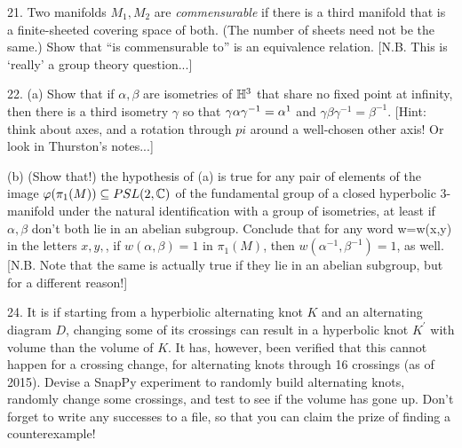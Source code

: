 \documentclass[12pt]{article}
\begin{document}
\begin{description}
\item{21.} Two manifolds $M_1,M_2$ are {\it commensurable} if there is a third manifold that
is a finite-sheeted covering space of both. (The number of sheets need not be the same.) Show that
``is commensurable to'' is an equivalence relation. [N.B. This is `really' a group theory 
question...]

\item{22.} (a) Show that if $\alpha,\beta$ are isometries of ${\mathbb H}^3$ that share no fixed point
at infinity, then there is a third isometry $\gamma$ so that $\gamma\alpha\gamma^{-1}=\alpha^{\-1}$
and $\gamma\beta\gamma^{-1}=\beta^{-1}$. [Hint: think about axes, and a rotation through $pi$
around a well-chosen other axis! Or look in Thurston's notes...]

\item{\spc} (b) (Show that!) the hypothesis of (a) is true for any pair of 
elements of the image $\varphi(\pi_1(M))\subseteq PSL(2,{\mathbb C})$ of the fundamental group of a closed
hyperbolic 3-manifold under the natural identification with a group of isometries, 
at least if $\alpha,\beta$ don't both lie in an abelian subgroup. Conclude that for 
any word w=w(x,y) in the letters $x,y,$, if 
$w(\alpha,\beta)=1$ in $\pi_1(M)$, then $w(\alpha^{-1},\beta^{-1})=1$, as well.
[N.B. Note that the same is actually true if they  lie in an abelian subgroup, but 
for a different reason!]


\item{24.} It is  if starting from a hyperbiolic alternating knot $K$ and an alternating diagram $D$,
changing some of its crossings can result in a hyperbolic knot $K^\prime$ with volume  than the volume of 
$K$. It has, however, been verified that this cannot happen for a  crossing change, 
for alternating knots through 16 crossings
(as of 2015). Devise a SnapPy experiment to randomly build alternating knots, randomly change some crossings, 
and test to see if the volume has gone up. Don't forget to write any successes to a file, so that you can 
claim the prize of finding a counterexample!

\end{description}
\vfill
\end{document}
